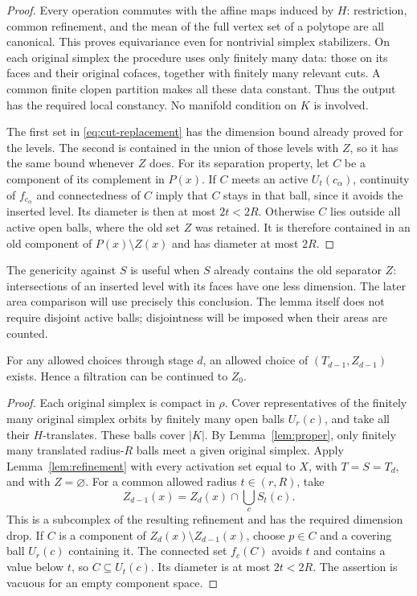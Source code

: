\begin{proof}
Every operation commutes with the affine maps induced by $H$:
restriction, common refinement, and the mean of the full vertex set of
a polytope are all canonical.  This proves equivariance even for
nontrivial simplex stabilizers.  On each original simplex the procedure
uses only finitely many data: those on its faces and their original
cofaces, together with finitely many relevant cuts.  A common finite
clopen partition makes all these data constant.  Thus the output has
the required local constancy.  No manifold condition on $K$ is involved.

The first set in \eqref{eq:cut-replacement} has the dimension bound
already proved for the levels.  The second is contained in the union
of those levels with $Z$, so it has the same bound whenever $Z$ does.
For its separation property, let $C$ be a component of its complement
in $P(x)$.  If $C$ meets an active $U_t(c_\alpha)$, continuity of
$f_{c_\alpha}$ and connectedness of $C$ imply that $C$ stays in that
ball, since it avoids the inserted level.  Its diameter is then at
most $2t<2R$.  Otherwise $C$ lies outside all active open balls, where
the old set $Z$ was retained.  It is therefore contained in an old
component of $P(x)\setminus Z(x)$ and has diameter at most $2R$.
\end{proof}

The genericity against $S$ is useful when $S$ already contains the old
separator $Z$: intersections of an inserted level with its faces have
one less dimension.  The later area comparison will use precisely
this conclusion.  The lemma itself does not require disjoint active
balls; disjointness will be imposed when their areas are counted.

\begin{lemma}\label{lem:filtration-exists}
For any allowed choices through stage $d$, an allowed choice of
$(T_{d-1},Z_{d-1})$ exists.  Hence a filtration can be continued to
$Z_0$.
\end{lemma}

\begin{proof}
Each original simplex is compact in $\rho$.  Cover representatives of
the finitely many original simplex orbits by finitely many open balls
$U_r(c)$, and take all their $H$-translates.  These balls cover $|K|$.
By Lemma~\ref{lem:proper}, only finitely many translated radius-$R$
balls meet a given original simplex.  Apply Lemma~\ref{lem:refinement}
with every activation set equal to $X$, with $T=S=T_d$, and with
$Z=\varnothing$.  For a common allowed radius $t\in(r,R)$, take
\[
 Z_{d-1}(x)=Z_d(x)\cap\bigcup_c S_t(c).
\]
This is a subcomplex of the resulting refinement and has the required
dimension drop.  If $C$ is a component of $Z_d(x)\setminus Z_{d-1}(x)$,
choose $p\in C$ and a covering ball $U_r(c)$ containing it.
The connected set $f_c(C)$ avoids $t$ and contains a value below $t$,
so $C\subseteq U_t(c)$.  Its diameter is at most $2t<2R$.
The assertion is vacuous for an empty component space.
\end{proof}

